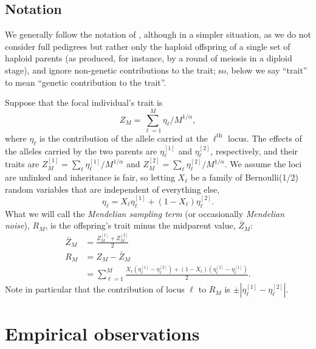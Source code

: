 \documentclass{article}
\newcommand{\1}{\mathbbm{1}}
\theoremstyle{remark}
\theoremstyle{definition}
\begin{document}
\subsection*{Notation}

We generally follow the notation of \citet{barton2017infinitesimal},
although in a simpler situation,
as we do not consider full pedigrees
but rather only the haploid offspring of a single set of haploid parents
(as produced, for instance, by a round of meiosis in a diploid stage),
and ignore non-genetic contributions to the trait;
so, below we say ``trait'' to mean ``genetic contribution to the trait''.

Suppose that the focal individual's trait is
$$
    Z_M = \sum_{\ell=1}^M \eta_\ell / M^{1/\alpha},
$$
where $\eta_\ell$ is the contribution of the allele carried at the $\ell^\text{th}$ locus.
The effects of the alleles carried by the two parents
are $\eta_\ell^{[1]}$ and $\eta_\ell^{[2]}$, respectively,
and their traits are
$Z_M^{[1]} = \sum_\ell \eta_\ell^{[1]} / M^{1/\alpha}$ and
$Z_M^{[2]} = \sum_\ell \eta_\ell^{[2]} / M^{1/\alpha}$.
We assume the loci are unlinked and inheritance is fair, so
letting $X_\ell$ be a family of Bernoulli(1/2) random variables that are independent of everything else,
$$
    \eta_\ell = X_\ell \eta_\ell^{[1]} + (1 - X_\ell) \eta_\ell^{[2]} .
$$
What we will call the \emph{Mendelian sampling term}
(or occasionally \emph{Mendelian noise}), $R_M$,
is the offspring's trait minus the midparent value, $\bar Z_M$:
\begin{align*}
    \bar Z_M &= \frac{Z_M^{[1]} + Z_M^{[2]}}{2} \\
    R_M &= Z_M - \bar Z_M \\
        &= \sum_{\ell=1}^M
            \frac{
                X_\ell (\eta_\ell^{[1]} - \eta_\ell^{[2]})
                + (1 - X_\ell) (\eta_\ell^{[2]} - \eta_\ell^{[1]})
            }{ 2 } .
\end{align*}
Note in particular that
the contribution of locus $\ell$ to $R_M$ is $\pm |\eta_\ell^{[1]} - \eta_\ell^{[2]}|$.


\section{Empirical observations}
\end{document}
